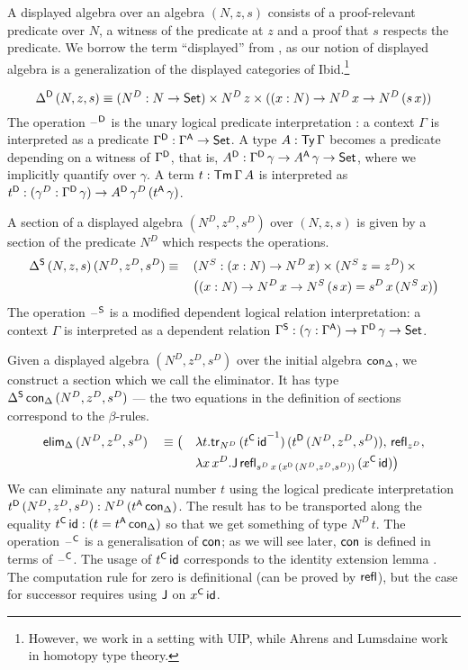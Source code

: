 \documentclass[acmsmall,screen]{acmart}
\begin{document}
A displayed algebra over an algebra $(N,z,s)$ consists of a
proof-relevant predicate over $N$, a witness of the predicate at $z$
and a proof that $s$ respects the predicate. We borrow the term
``displayed'' from \cite{displayedCategories}, as our notion of
displayed algebra is a generalization of the displayed categories of Ibid.\footnote{However, we work in a setting with UIP, while Ahrens and Lumsdaine work in homotopy type theory.}

\[
\Delta^{\mathsf{D}}\,(N,z,s) \equiv (N^D:N\rightarrow\mathsf{Set})\times N^D\,z\times ((x:N)\rightarrow N^D\,x\rightarrow N^D\,(s\,x))
\]
The operation $\mathord{\hspace{1pt}\text{--}\hspace{1pt}}^{\mathsf{D}}$ is the unary logical predicate
interpretation \cite{bernardy12parametricity}: a context $\Gamma$ is
interpreted as a predicate $\Gamma^{\mathsf{D}}:\Gamma^{\mathsf{A}}\rightarrow\mathsf{Set}$. A type
$A:\mathsf{Ty}\,\Gamma$ becomes a predicate depending on a witness of
$\Gamma^{\mathsf{D}}$, that is, $A^{\mathsf{D}}:\Gamma^{\mathsf{D}}\,\gamma\rightarrow A^{\mathsf{A}}\,\gamma\rightarrow\mathsf{Set}$,
where we implicitly quantify over $\gamma$. A term
$t:\mathsf{Tm}\,\Gamma\,A$ is interpreted as
$t^{\mathsf{D}}:(\gamma^D:\Gamma^{\mathsf{D}}\,\gamma)\rightarrow A^{\mathsf{D}}\,\gamma^D\,(t^{\mathsf{A}}\,\gamma)$.

A section of a displayed algebra $(N^D,z^D,s^D)$ over $(N,z,s)$ is
given by a section of the predicate $N^D$ which respects the
operations.
\begin{alignat*}{5}
  & \Delta^{\mathsf{S}}\,(N,z,s)\,(N^D,z^D,s^D) \equiv\, && (N^S:(x:N)\rightarrow N^D\,x)\times (N^S\,z=z^D)\,\times \\
  & && \big((x:N)\rightarrow N^D\,x\rightarrow N^S\,(s\,x) = s^D\,x\,(N^S\,x)\big)
\end{alignat*}
The operation $\mathord{\hspace{1pt}\text{--}\hspace{1pt}}^{\mathsf{S}}$ is a modified dependent logical relation
interpretation: a context $\Gamma$ is interpreted as a dependent
relation $\Gamma^{\mathsf{S}}:(\gamma:\Gamma^{\mathsf{A}})\rightarrow\Gamma^{\mathsf{D}}\,\gamma\rightarrow\mathsf{Set}$.

Given a displayed algebra $(N^D,z^D,s^D)$ over the initial algebra $\mathsf{con}_\Delta$,
we construct a section which we call the eliminator. It has type
$\Delta^{\mathsf{S}}\,\mathsf{con}_\Delta\,(N^D,z^D,s^D)$ --- the two equations in the
definition of sections correspond to the $\beta$-rules.
\begin{alignat*}{5}
  & \mathsf{elim}_\Delta\,(N^D,z^D,s^D) && \equiv \big( && \lambda t.\mathsf{tr}_{N^D}\,({t^{\mathsf{C}}\,\mathsf{id}}^{-1})\,(t^{\mathsf{D}}\,(N^D,z^D,s^D)),\, \mathsf{refl}_{z^D}, \\
  & && && \lambda x\,x^D. \mathsf{J}\,\mathsf{refl}_{s^D\,x\,(x^{\mathsf{D}}\,(N^D,z^D,s^D))}\,(x^{\mathsf{C}}\,\mathsf{id})\big)
\end{alignat*}
We can eliminate any natural number $t$ using the logical predicate
interpretation $t^{\mathsf{D}}\,(N^D,z^D,s^D): N^D\,(t^{\mathsf{A}}\,\mathsf{con}_\Delta)$. The
result has to be transported along the equality $t^{\mathsf{C}}\,\mathsf{id} : (t =
t^{\mathsf{A}}\,\mathsf{con}_\Delta)$ so that we get something of type $N^D\,t$. The
operation $\mathord{\hspace{1pt}\text{--}\hspace{1pt}}^{\mathsf{C}}$ is a generalisation of $\mathsf{con}$; as we will see
later, $\mathsf{con}$ is defined in terms of $\mathord{\hspace{1pt}\text{--}\hspace{1pt}}^{\mathsf{C}}$. The usage of
$t^{\mathsf{C}}\,\mathsf{id}$ corresponds to the identity extension lemma
\cite{atkey}. The computation rule for zero is definitional (can be
proved by $\mathsf{refl}$), but the case for successor requires using $\mathsf{J}$ on
$x^{\mathsf{C}}\,\mathsf{id}$.
\end{document}
